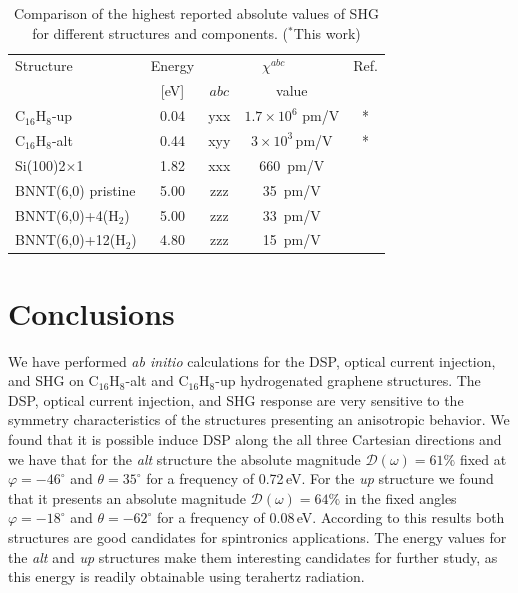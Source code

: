 \documentclass[pss]{wiley2sp} %
\begin{document}
\begin{table}[htb]%
\centering
\sidecaption
\begin{tabular}{lcccc}
\hline
\hline
Structure & \hspace{-5mm}Energy & \multicolumn{2}{c}{$\chi^{abc} $} &  Ref.\\
\cline{3-4} & \hspace{-5mm}[eV] & $abc$ & value \\
\hline
C$_{16}$H$_{8}$-up    &  0.04  & yxx   & $1.7\times10^{6}$ \scriptsize{pm/V}  & *     \\
C$_{16}$H$_{8}$-alt   &  0.44  & xyy   & $3\times10^{3}$\,\scriptsize{pm/V}  & *     \\
Si(100)2$\times$1     &  1.82  & xxx   & 660\, \scriptsize{pm/V}  & \cite{andersonPRB15}  \\
BNNT(6,0) pristine    &  5.00  & zzz   & 35\,  \scriptsize{pm/V}  & \cite{salazarPRB14} \\
BNNT(6,0)+4(H$_{2}$)  &  5.00  & zzz   & 33\,  \scriptsize{pm/V}  & \cite{salazarPRB14} \\
BNNT(6,0)+12(H$_{2}$) &  4.80  & zzz   & 15\,  \scriptsize{pm/V}  & \cite{salazarPRB14} \\
\hline
\hline
\end{tabular}
\caption[]{%
Comparison of the highest reported absolute values of SHG for 
different structures and components. ($^{*}$This work)}
\label{tab:shgcomp}
\end{table}


\section{Conclusions}\label{sec:conclusions}

We have performed \emph{ab initio} calculations for the DSP, optical current
injection, and SHG on C$_{16}$H$_{8}$-alt and C$_{16}$H$_{8}$-up hydrogenated
graphene structures. The DSP, optical current injection, and SHG response are
very sensitive to the symmetry characteristics of the structures presenting an
anisotropic behavior. We found that it is possible induce DSP along the all
three Cartesian directions and we have that for the \emph{alt} structure the
absolute magnitude $\mathcal{D}(\omega)=61\%$ fixed at $\varphi=-46^{\circ}$ and
$\theta=35^{\circ}$ for a frequency of 0.72\,eV. For the \emph{up} structure we
found that it presents an absolute magnitude $\mathcal{D}(\omega)=64\%$ in the
fixed angles $\varphi=-18^{\circ}$ and $\theta=-62^{\circ}$ for a frequency of
0.08\,eV. According to this results both structures are good candidates for
spintronics applications. The energy values for the \emph{alt} and \emph{up}
structures make them interesting candidates for further study, as this energy is
readily obtainable using terahertz radiation.
\end{document}
